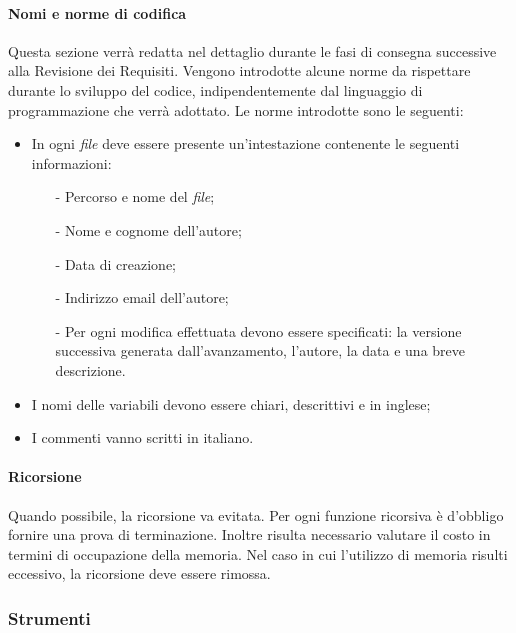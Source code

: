 \paragraph{Nomi e norme di codifica}
Questa sezione verrà redatta nel dettaglio durante le fasi di consegna successive alla Revisione dei Requisiti. Vengono introdotte alcune norme da rispettare durante lo sviluppo del codice, indipendentemente dal linguaggio di programmazione che verrà adottato. Le norme introdotte sono le seguenti:

\begin{itemize}
	\item In ogni \textit{file} deve essere presente un'intestazione contenente le seguenti informazioni: 
	\begin{itemize}
		\item[-] Percorso e nome del \textit{file};
		\item[-] Nome e cognome dell'autore;
		\item[-] Data di creazione;
		\item[-] Indirizzo email dell’autore;
		\item[-] Per ogni modifica effettuata devono essere specificati: la versione successiva generata dall'avanzamento, l'autore, la data e una breve descrizione.	
	\end{itemize}
	\item I nomi delle variabili devono essere chiari, descrittivi e in inglese;
	\item I commenti vanno scritti in italiano.
\end{itemize}

\paragraph{Ricorsione}
Quando possibile, la ricorsione va evitata. Per ogni funzione ricorsiva è d'obbligo fornire una prova di terminazione. Inoltre risulta necessario valutare il costo in termini di occupazione della memoria. Nel caso in cui l'utilizzo di memoria risulti eccessivo, la ricorsione deve essere rimossa.
\subsubsection{Strumenti}

